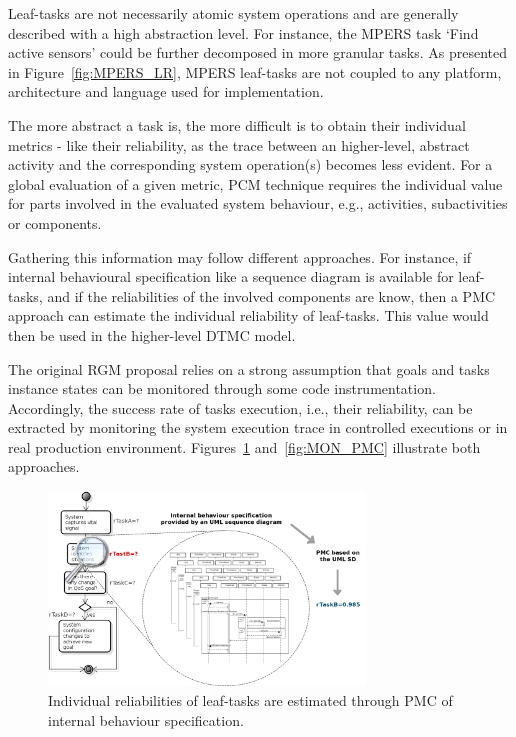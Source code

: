 Leaf-tasks are not necessarily atomic system operations and are generally described with a high abstraction level. For instance, the MPERS task `Find active sensors' could be further decomposed in more granular tasks. As presented in Figure~\ref{fig:MPERS_LR}, MPERS leaf-tasks are not coupled to any platform, architecture and language used for implementation.


The more abstract a task is, the more difficult is to 
obtain their individual metrics - like their reliability, as the trace between an higher-level, abstract activity and the corresponding system operation(s) becomes less evident. For a global evaluation of a given metric, PCM technique requires the individual value for parts involved in the evaluated system behaviour, e.g., activities, subactivities or components.

Gathering this information may follow different approaches. For instance, if internal behavioural specification like a sequence diagram is available for leaf-tasks, and if the reliabilities of the involved components are know, then a PMC approach can estimate the individual reliability of leaf-tasks. This value would then be used in the higher-level DTMC model. 

The original RGM proposal relies on a strong assumption that goals and tasks instance states can be monitored through some code instrumentation. Accordingly, the success rate of tasks execution, i.e., their reliability, can be extracted by monitoring the system execution trace in controlled executions or in real production environment. Figures~\ref{fig:MD_PMC} and~\ref{fig:MON_PMC} illustrate both approaches.

\begin{figure}[ht!]
\centering
\includegraphics[width=0.75\textwidth]{imgs/MD_PMC.png}
\caption{Individual reliabilities of leaf-tasks are estimated through PMC of internal behaviour specification.}
\label{fig:MD_PMC}
\end{figure}

